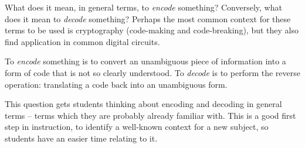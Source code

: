 

What does it mean, in general terms, to {\it encode} something?  Conversely, what does it mean to {\it decode} something?  Perhaps the most common context for these terms to be used is cryptography (code-making and code-breaking), but they also find application in common digital circuits.







To {\it encode} something is to convert an unambiguous piece of information into a form of code that is not so clearly understood.  To {\it decode} is to perform the reverse operation: translating a code back into an unambiguous form.







This question gets students thinking about encoding and decoding in general terms -- terms which they are probably already familiar with.  This is a good first step in instruction, to identify a well-known context for a new subject, so students have an easier time relating to it.




